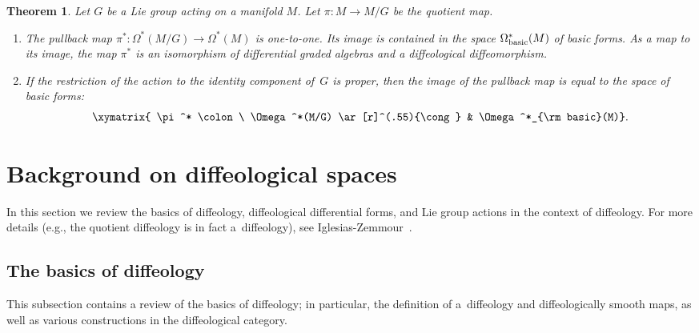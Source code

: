 \documentclass[11pt]{article}
\numberwithin{equation}{section}
\newtheorem{Theorem}{Theorem}[section]
\begin{document}
\begin{Theorem}\label{t:main}
Let $G$ be a Lie group acting on a manifold $M$.
Let $\pi\colon M\to M/G$ be the quotient map.
\begin{enumerate}\itemsep=0pt
\item[$(i)$] The pullback map $\pi^* \colon \Omega^*(M/G) \to \Omega^*(M)$
is one-to-one. Its image is contained in the space $\Omega^*_{\rm basic}(M)$
of basic forms. As a map to its image,
the map $\pi^*$ is an isomorphism of differential graded algebras
and a diffeological diffeomorphism.
\item[$(ii)$] If the restriction of the action to the identity component of~$G$
is proper, then the image of the pullback map is equal to the space
of basic forms:
\begin{gather*}\xymatrix{
\pi^* \colon \ \Omega^*(M/G) \ar[r]^(.55){\cong}
& \Omega^*_{\rm basic}(M)}.\end{gather*}
\end{enumerate}
\end{Theorem}

\setcounter{section}{1}
\setcounter{subsection}{0}
\setcounter{subsubsection}{0}
\setcounter{Theorem}{2}
\setcounter{equation}{0}
\section{Background on dif\/feological spaces}\label{sec:diffeology}

In this section we review the basics of dif\/feology, dif\/feological dif\/ferential forms, and Lie group actions in the context of dif\/feology. For more details (e.g., the quotient dif\/feology is in fact a~dif\/feology), see Iglesias-Zemmour~\cite{iglesias}.

\subsection*{The basics of dif\/feology}

This subsection contains a review of the basics of dif\/feology; in particular, the def\/inition of a~dif\/feology and dif\/feologically smooth maps, as well as various constructions in the dif\/feological category.
\end{document}
